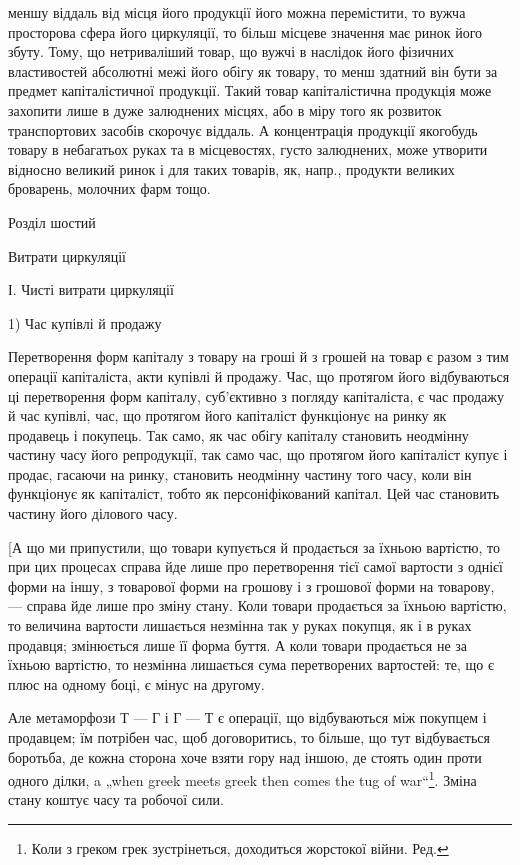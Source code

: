 \parcont{}  %
меншу віддаль від місця його продукції його можна перемістити, то
вужча просторова сфера його циркуляції, то більш місцеве значення має
ринок його збуту. Тому, що нетриваліший товар, що вужчі в наслідок
його фізичних властивостей абсолютні межі його обігу як товару, то
менш здатний він бути за предмет капіталістичної продукції. Такий
товар капіталістична продукція може захопити лише в дуже залюднених
місцях, або в міру того як розвиток транспортових засобів скорочує
віддаль. А концентрація продукції якогобудь товару в небагатьох руках
та в місцевостях, густо залюднених, може утворити відносно великий ринок
і для таких товарів, як, напр., продукти великих броварень, молочних
фарм тощо.

Розділ шостий

Витрати циркуляції

І. Чисті витрати циркуляції

1) Час купівлі й продажу

Перетворення форм капіталу з товару на гроші й з грошей на
товар є разом з тим операції капіталіста, акти купівлі й продажу. Час,
що протягом його відбуваються ці перетворення форм капіталу, суб’єктивно
з погляду капіталіста, є час продажу й час купівлі, час, що протягом
його капіталіст функціонує на ринку як продавець і покупець. Так само,
як час обігу капіталу становить неодмінну частину часу його репродукції,
так само час, що протягом його капіталіст купує і продає, гасаючи на
ринку, становить неодмінну частину того часу, коли він функціонує як
капіталіст, тобто як персоніфікований капітал. Цей час становить частину
його ділового часу.

[А що ми припустили, що товари купується й продається за їхньою
вартістю, то при цих процесах справа йде лише про перетворення тієї
самої вартости з однієї форми на іншу, з товарової форми на грошову
і з грошової форми на товарову, — справа йде лише про зміну стану.
Коли товари продається за їхньою вартістю, то величина вартости
лишається незмінна так у руках покупця, як і в руках продавця; змінюється
лише її форма буття. А коли товари продається не за їхньою вартістю,
то незмінна лишається сума перетворених вартостей: те, що є плюс на
одному боці, є мінус на другому.

Але метаморфози Т — Г і Г — Т є операції, що відбуваються між
покупцем і продавцем; їм потрібен час, щоб договоритись, то більше,
що тут відбувається боротьба, де кожна сторона хоче взяти гору над
іншою, де стоять один проти одного ділки, a „when greek meets greek
then comes the tug of war“\footnote*{
Коли з греком грек зустрінеться, доходиться жорстокої війни. Ред.
}. Зміна стану коштує часу та робочої сили.
\parbreak{}  %
